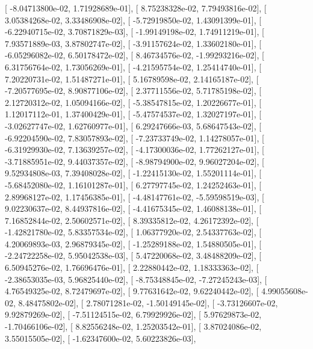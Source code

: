 \documentclass{article}
\begin{document}
       [ -8.04713800e-02,   1.71928689e-01],
       [  8.75238328e-02,   7.79493816e-02],
       [  3.05384268e-02,   3.33486908e-02],
       [ -5.72919850e-02,   1.43091399e-01],
       [ -6.22940715e-02,   3.70871829e-03],
       [ -1.99149198e-02,   1.74911219e-01],
       [  7.93571889e-03,   3.87802747e-02],
       [ -3.91157624e-02,   1.33602180e-01],
       [ -6.05296082e-02,   6.50178472e-02],
       [  8.46734576e-02,  -1.99293216e-02],
       [  6.31756764e-02,   1.73056269e-01],
       [ -4.21595754e-02,   1.25414740e-01],
       [  7.20220731e-02,   1.51487271e-01],
       [  5.16789598e-02,   2.14165187e-02],
       [ -7.20577695e-02,   8.90877106e-02],
       [  2.37711556e-02,   5.71785198e-02],
       [  2.12720312e-02,   1.05094166e-02],
       [ -5.38547815e-02,   1.20226677e-01],
       [  1.12017112e-01,   1.37400429e-01],
       [ -5.47574537e-02,   1.32027197e-01],
       [ -3.02627747e-02,   1.62760977e-01],
       [  6.29247666e-03,   5.68647543e-02],
       [ -6.92204590e-02,   7.83057893e-02],
       [ -7.23733749e-02,   1.14278057e-01],
       [ -6.31929930e-02,   7.13639257e-02],
       [ -4.17300036e-02,   1.77262127e-01],
       [ -3.71885951e-02,   9.44037357e-02],
       [ -8.98794900e-02,   9.96027204e-02],
       [  9.52934808e-03,   7.39408028e-02],
       [ -1.22415130e-02,   1.55201114e-01],
       [ -5.68452080e-02,   1.16101287e-01],
       [  6.27797745e-02,   1.24252463e-01],
       [  2.89968127e-02,   1.17456385e-01],
       [ -4.48147761e-02,  -5.59598519e-03],
       [  9.02230637e-02,   8.44937816e-02],
       [ -4.41675345e-02,   1.46088138e-01],
       [  7.16852844e-02,   2.50602571e-02],
       [  8.39335812e-02,   4.26172392e-02],
       [ -1.42821780e-02,   5.83357534e-02],
       [  1.06377920e-02,   2.54337763e-02],
       [  4.20069893e-03,   2.96879345e-02],
       [ -1.25289188e-02,   1.54880505e-01],
       [ -2.24722258e-02,   5.95042538e-03],
       [  5.47220068e-02,   3.48488209e-02],
       [  6.50945276e-02,   1.76696476e-01],
       [  2.22880442e-02,   1.18333363e-02],
       [ -2.38653035e-03,   5.96825440e-02],
       [ -8.75348845e-02,  -7.27245243e-03],
       [  4.76549325e-02,   8.72479697e-02],
       [  9.77631642e-02,   9.62240442e-02],
       [  4.99055608e-02,   8.48475802e-02],
       [  2.78071281e-02,  -1.50149145e-02],
       [ -3.73126607e-02,   9.92879269e-02],
       [ -7.51124515e-02,   6.79929926e-02],
       [  5.97629873e-02,  -1.70466106e-02],
       [  8.82556248e-02,   1.25203542e-01],
       [  3.87024086e-02,   3.55015505e-02],
       [ -1.62347600e-02,   5.60223826e-03],
\end{document}
